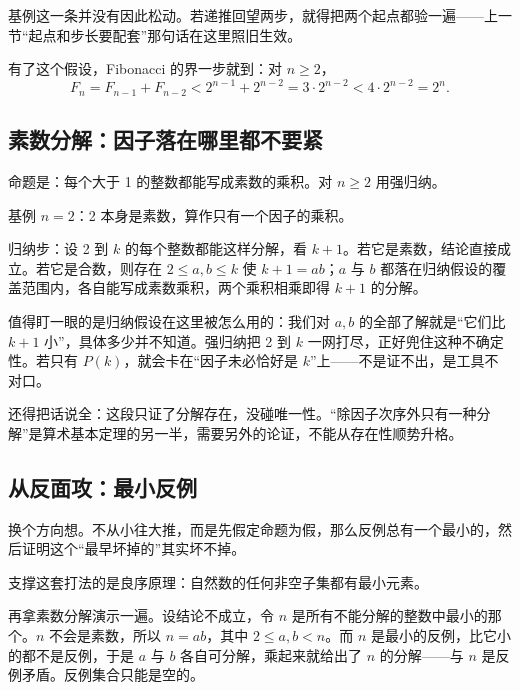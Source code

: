 基例这一条并没有因此松动。若递推回望两步，就得把两个起点都验一遍——上一节``起点和步长要配套''那句话在这里照旧生效。

有了这个假设，Fibonacci 的界一步就到：对 \(n\ge2\)，
\[
F_n=F_{n-1}+F_{n-2}<2^{n-1}+2^{n-2}=3\cdot 2^{n-2}<4\cdot 2^{n-2}=2^n .
\]

\subsection{素数分解：因子落在哪里都不要紧}

命题是：每个大于 1 的整数都能写成素数的乘积。对 \(n\ge2\) 用强归纳。

基例 \(n=2\)：2 本身是素数，算作只有一个因子的乘积。

归纳步：设 2 到 \(k\) 的每个整数都能这样分解，看 \(k+1\)。若它是素数，结论直接成立。若它是合数，则存在 \(2\le a,b\le k\) 使 \(k+1=ab\)；\(a\) 与 \(b\) 都落在归纳假设的覆盖范围内，各自能写成素数乘积，两个乘积相乘即得 \(k+1\) 的分解。

值得盯一眼的是归纳假设在这里被怎么用的：我们对 \(a,b\) 的全部了解就是``它们比 \(k+1\) 小''，具体多少并不知道。强归纳把 2 到 \(k\) 一网打尽，正好兜住这种不确定性。若只有 \(P(k)\)，就会卡在``因子未必恰好是 \(k\)''上——不是证不出，是工具不对口。

还得把话说全：这段只证了分解存在，没碰唯一性。``除因子次序外只有一种分解''是算术基本定理的另一半，需要另外的论证，不能从存在性顺势升格。

\subsection{从反面攻：最小反例}

换个方向想。不从小往大推，而是先假定命题为假，那么反例总有一个最小的，然后证明这个``最早坏掉的''其实坏不掉。

支撑这套打法的是良序原理：自然数的任何非空子集都有最小元素。

再拿素数分解演示一遍。设结论不成立，令 \(n\) 是所有不能分解的整数中最小的那个。\(n\) 不会是素数，所以 \(n=ab\)，其中 \(2\le a,b<n\)。而 \(n\) 是最小的反例，比它小的都不是反例，于是 \(a\) 与 \(b\) 各自可分解，乘起来就给出了 \(n\) 的分解——与 \(n\) 是反例矛盾。反例集合只能是空的。

